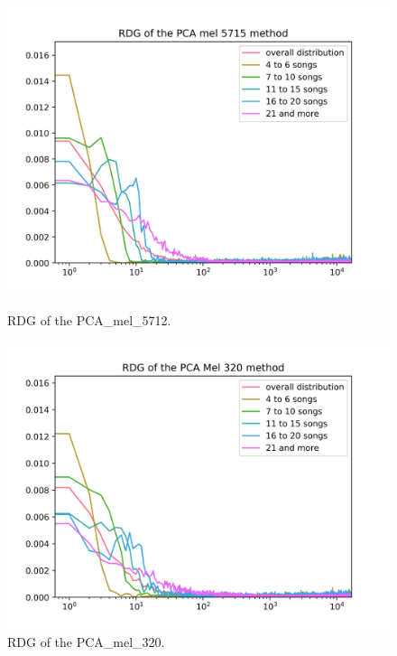\begin{figure}[h]
\centering
\begin{minipage}{.45\textwidth}
  \centering
  \includegraphics[width=1\linewidth]{./img/pca_mel_5715_graph.png}
  \caption{RDG of the PCA\_mel\_5712.}
  \label{fig:pca_mel_5715_distribution}
\end{minipage}
 \vspace{1cm}
\begin{minipage}{.45\textwidth}
  \centering
  \includegraphics[width=1\linewidth]{./img/pca_mel_320_graph.png}
  \caption{RDG of the PCA\_mel\_320.}
  \label{fig:pca_mel_320_distribution}
\end{minipage}
\end{figure}\label{fig:pca_mel_comparison_graps}


